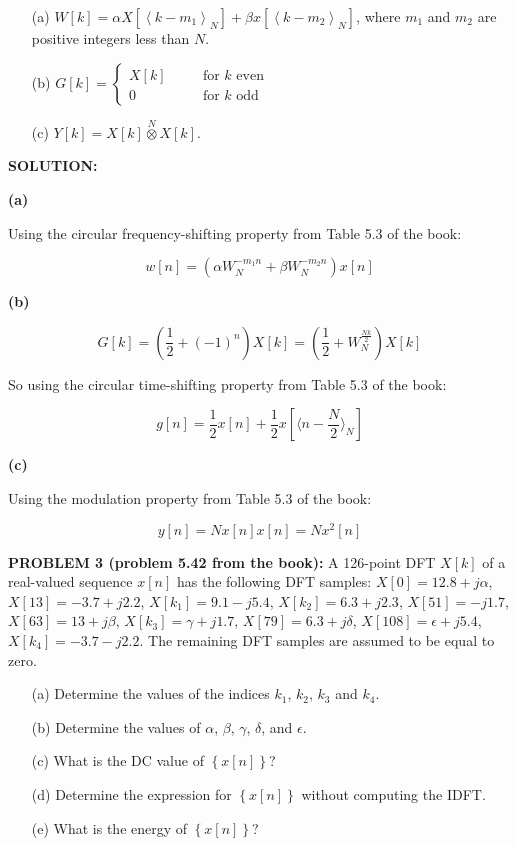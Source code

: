 \documentclass[a4paper,11pt,oneside]{article}
\begin{document}
\begin{itemize}
\item[(a)] $W[k]=\alpha X[\left\langle k-m_1\right\rangle_{N}]+\beta x[\left\langle k-m_2\right\rangle_{N}]$, where $m_1$ and $m_2$ are positive integers less than $N$.
\item[(b)] $G[k]=\left\{\begin{array}{lll}X[k]&\quad&\textrm{for } k \textrm{ even}\\0&\quad&\textrm{for } k \textrm{ odd}\end{array}\right.$
\item[(c)] $Y[k]=X[k]\stackrel{N}{\otimes} X[k]$. 
\end{itemize}




\vspace{1cm}
\textbf{SOLUTION:}

\textbf{(a)}

Using the circular frequency-shifting property from Table 5.3 of the book:

\[
w[n]=\left(\alpha W_{N}^{-m_1n}+\beta W_{N}^{-m_2n} \right)x[n]
\]


\textbf{(b)}

\[
G[k] = \left(\frac{1}{2}+(-1)^n\right)X[k]=\left(\frac{1}{2}+W_N^{\frac{Nk}{2}}\right)X[k]
\]

\noindent So using the circular time-shifting property from Table 5.3 of the book:

\[
g[n] = \frac{1}{2}x[n]+\frac{1}{2}x[\langle n-\frac{N}{2}\rangle_N]
\]


\textbf{(c)}

Using the modulation property from Table 5.3 of the book:

\[
y[n] = Nx[n]x[n]=Nx^2[n]
\]

\vspace{1cm}

\noindent \textbf{PROBLEM 3 (problem 5.42 from the book):} A 126-point DFT $X[k]$ of a real-valued sequence $x[n]$ has the following DFT samples: $X[0]=12.8+j\alpha$, $X[13]=-3.7+j2.2$, $X[k_1]=9.1-j5.4$, $X[k_2]=6.3+j2.3$, $X[51]=-j1.7$, $X[63]=13+j\beta$, $X[k_3]=\gamma+j1.7$, $X[79]=6.3+j\delta$, $X[108]=\epsilon+j5.4$, $X[k_4]=-3.7-j2.2$. The remaining DFT samples are assumed to be equal to zero.

\begin{itemize}
\item[(a)] Determine the values of the indices $k_1$, $k_2$, $k_3$ and $k_4$.
\item[(b)] Determine the values of $\alpha$, $\beta$, $\gamma$, $\delta$, and $\epsilon$.
\item[(c)] What is the DC value of $\left\{x[n]\right\}$?
\item[(d)] Determine the expression for $\left\{x[n]\right\}$ without computing the IDFT.
\item[(e)] What is the energy of $\left\{x[n]\right\}$?
\end{itemize}
\end{document}
